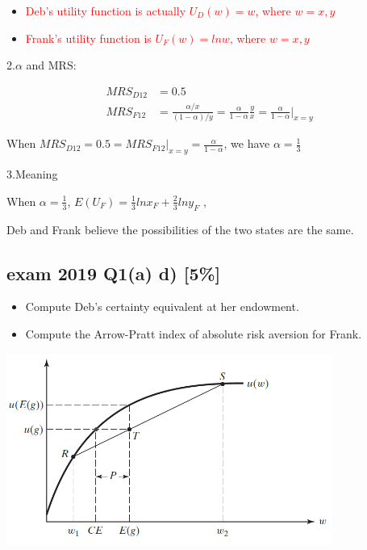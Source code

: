 \documentclass{article}
\begin{document}
\begin{mdframed}[backgroundcolor=blue!20,linecolor=white]

\begin{itemize}

\item \textcolor{red}{Deb's utility function is actually $U_D(w) = w$, where $w = x, y$}
\item \textcolor{red}{Frank's utility function is $U_F(w) = lnw$, where $w = x, y$}
\end{itemize}


\end{mdframed}


2.$\alpha$ and MRS:

\begin{align*}
MRS_{D12} &= 0.5 \\
MRS_{F12} &= \frac{\alpha / x}{({1-\alpha})/ y} = \frac{\alpha}{1-\alpha} \frac{y}{x} =  \frac{\alpha}{1-\alpha} \bigg\vert_{x=y}
\end{align*}

When $MRS_{D12} = 0.5 = MRS_{F12}\bigg\vert_{x=y} = \frac{\alpha}{1-\alpha}$, we have $\alpha = \frac{1}{3}$

3.Meaning

When $\alpha = \frac{1}{3}$, $E(U_F) =\frac{1}{3} ln x_F +  \frac{2}{3} ln y_F$ ,

Deb and Frank believe the possibilities of the two states are the same.

\subsection{exam 2019 Q1(a) d) [5\%] }

\begin{itemize}
\item Compute Deb's certainty equivalent at her endowment. 
\item Compute the Arrow-Pratt index of absolute risk aversion for Frank.
\end{itemize}

\begin{mdframed}[backgroundcolor=blue!20,linecolor=white]
\vspace{2mm}
{\centering
\includegraphics[width=0.8\textwidth]{4.cereq}
\label{cf}}
\vspace{2mm}
\end{mdframed}
\end{document}

